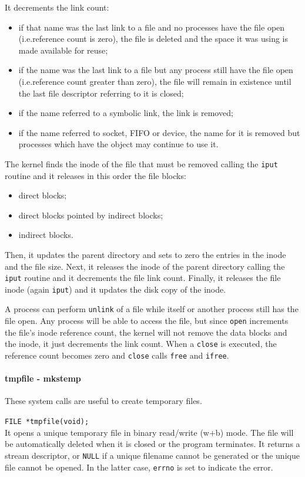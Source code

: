 It decrements the link count:
\begin{itemize}
\item if that name was the last link to a file and no processes have the file open (i.e.\@ reference count is zero), the file is deleted and the space it was using is made available for reuse;
\item if the name was the last link to a file but any process still have the file open (i.e.\@ reference count greater than zero), the file will remain in existence until the last file descriptor referring to it is closed;
\item if the name referred to a symbolic link, the link is removed;
\item if the name referred to socket, FIFO or device, the name for it is removed but processes which have the object may continue to use it.
\end{itemize}
The kernel finds the inode of the file that must be removed calling the \texttt{iput} routine and it releases in this order the file blocks:
\begin{itemize}
\item direct blocks;
\item direct blocks pointed by indirect blocks;
\item indirect blocks.
\end{itemize}
Then, it updates the parent directory and sets to zero the entries in the inode and the file size. Next, it releases the inode of the parent directory calling the \texttt{iput} routine and it decrements
the file link count. Finally, it releases the file inode (again \texttt{iput}) and it updates the disk copy of the inode.

A process can perform \texttt{unlink} of a file while itself or another process still has the file open. Any process will be able to access the file, but since \texttt{open} increments the file's inode reference count, the kernel will not remove the data blocks and the inode, it just decrements the link count. When a \texttt{close} is executed, the reference count becomes zero and \texttt{close} calls \texttt{free} and \texttt{ifree}.

\paragraph{tmpfile - mkstemp}
These system calls are useful to create temporary files.

\texttt{FILE *tmpfile(void);}
\\
It opens a unique temporary file in binary read/write (w+b) mode. The file will be automatically deleted when it is closed or the program terminates. It returns a stream descriptor, or \texttt{NULL} if a  unique filename cannot be generated or the unique file cannot be opened. In the latter case, \texttt{errno} is set to indicate the error.

